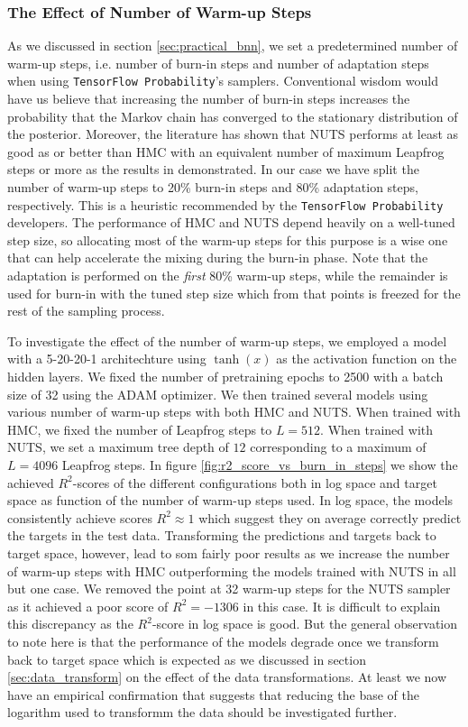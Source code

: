 \subsubsection{The Effect of Number of Warm-up Steps}
As we discussed in section \ref{sec:practical_bnn}, we set a predetermined number of warm-up steps, i.e. number of burn-in steps and number of adaptation steps when using {\tt TensorFlow Probability}'s samplers.
Conventional wisdom would have us believe that increasing the number of burn-in steps increases the probability that the Markov chain has converged
to the stationary distribution of the posterior. Moreover, the literature has shown that NUTS performs at least as good as or better than HMC with an equivalent number of maximum Leapfrog steps or more as the results in \cite{nuts} demonstrated. In our case we have split the number of warm-up steps to 20\% burn-in steps and 80\% adaptation steps, respectively. This is a heuristic recommended by the {\tt TensorFlow Probability} developers. The performance of HMC and NUTS depend heavily on a well-tuned step size, so allocating most of the warm-up steps for this purpose is a wise one that can help accelerate the mixing during the burn-in phase. Note that the adaptation is performed on the \textit{first} 80\% warm-up steps, while the remainder is used for burn-in with the tuned step size which from that points is freezed for the rest of the sampling process.

To investigate the effect of the number of warm-up steps, we employed a model with a 5-20-20-1 architechture using $\tanh(x)$ as the activation function on the hidden layers. We fixed the number of pretraining epochs to 2500 with a batch size of 32 using the ADAM optimizer.
We then trained several models using various number of warm-up steps with both HMC and NUTS. When trained with HMC, we fixed the number of Leapfrog steps to $L = 512$. When trained with NUTS, we set a maximum tree depth of $12$ corresponding to a maximum of $L = 4096$ Leapfrog steps.
In figure \ref{fig:r2_score_vs_burn_in_steps} we show the achieved $R^2$-scores of the different configurations both in log space and target space as function of the number of warm-up steps used. In log space, the models consistently achieve scores $R^2 \approx 1$ which suggest they on average correctly predict the targets in the test data. Transforming the predictions and targets back to target space, however, lead to som fairly poor results as we increase the number of warm-up steps with HMC outperforming the models trained with NUTS in all but one case. We removed the point at 32 warm-up steps for the NUTS sampler as it achieved a poor score of $R^2 = -1306$ in this case. It is difficult to explain this discrepancy as the $R^2$-score in log space is good. But the general observation to note here is that the performance of the models degrade once we transform back to target space which is expected as we discussed in section \ref{sec:data_transform} on the effect of the data transformations. At least we now have an empirical confirmation that suggests that reducing the base of the logarithm used to transformm the data should be investigated further. 

